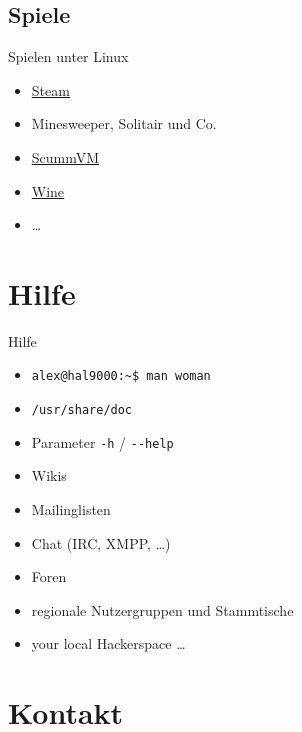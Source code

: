 \documentclass{beamer}
\begin{document}
\subsection{Spiele}

\begin{frame}{Spielen unter Linux}
    \begin{itemize}
        \item \href{https://store.steampowered.com/linux}{Steam}
        \item Minesweeper, Solitair und Co.
        \item \href{https://www.scummvm.org/}{ScummVM}
        \item \href{https://www.winehq.org/}{Wine}
        \item …
    \end{itemize}
\end{frame}

\section{Hilfe}

\frame{\tableofcontents[currentsection]}

\begin{frame}{Hilfe}
    \begin{itemize}
        \item \texttt{alex@hal9000:\textasciitilde\$ man woman}
        \item \texttt{/usr/share/doc}
        \item Parameter \texttt{-h} / \texttt{-{}-help}
        \item Wikis
        \item Mailinglisten
        \item Chat (IRC, XMPP, …)
        \item Foren
        \item regionale Nutzergruppen und Stammtische
        \item your local Hackerspace …
    \end{itemize}
\end{frame}

\section{Kontakt}
\end{document}
